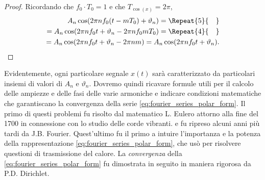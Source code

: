 \documentclass[12pt,oneside,openany]{memoir}
\numberwithin{equation}{subsection}
\newcommand{\quads}[1]{\Repeat{#1}{\quad}}
\begin{document}
\begin{proof}
Ricordando che $f_0 \cdot T_0 = 1$ e che $T_{\cos(x)} = 2\pi$,
\begin{equation}
\begin{split}
	A_n \cos(2 \pi n f_0 (t - mT_0) + \vartheta_n) =
	\quads{5}
	\\
	= A_n \cos(2 \pi n f_0 t + \vartheta_n - 2 \pi n f_0 m T_0) =
	\quads{4}
	\\
	= A_n \cos(2 \pi n f_0 t + \vartheta_n - 2 \pi n m) = A_n \cos(2 \pi n f_0 t + \vartheta_n).
\end{split}
\end{equation}
\end{proof}
Evidentemente, ogni particolare segnale $x(t)$ sar\`a caratterizzato da particolari insiemi di valori di $A_n$ e $\vartheta_n$. Dovremo quindi ricavare formule utili per il calcolo delle ampiezze e delle fasi delle varie armoniche e indicare condizioni matematiche che garantiscano la convergenza della serie \eqref{eq:fourier_series_polar_form}. Il primo di questi problemi fu risolto dal matematico L. Eulero attorno alla fine del 1700 in connessione con lo studio delle corde vibranti. e fu ripreso alcuni anni pi\`u tardi da J.B. Fourier. Quest'ultimo fu il primo a intuire l'importanza e la potenza della rappresentazione \eqref{eq:fourier_series_polar_form}, che us\`o per risolvere questioni di trasmissione del calore. La \textit{convergenza} della \eqref{eq:fourier_series_polar_form} fu dimostrata in seguito in maniera rigorosa da P.D. Dirichlet.
\end{document}
